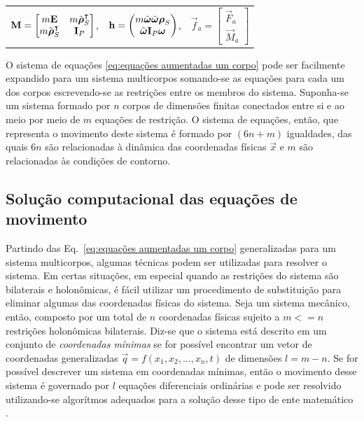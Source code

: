 \begin{tabular}{lll}
 $\boldsymbol{\mathrm{M}} = \begin{bmatrix}m\boldsymbol{\mathrm{E}} & m\tilde{\boldsymbol{\mathrm{\rho}}}_S^\intercal\\ m\tilde{\boldsymbol{\mathrm{\rho}}}_S^\intercal & \boldsymbol{\mathrm{I}}_P \end{bmatrix}$, &
 $\boldsymbol{\mathrm{h}} = \begin{pmatrix} m\tilde{\boldsymbol{\mathrm{\omega}}}\tilde{\boldsymbol{\mathrm{\omega}}}\boldsymbol{\mathrm{\rho}}_S \\ \tilde{\boldsymbol{\mathrm{\omega}}}\boldsymbol{\mathrm{I}}_P\boldsymbol{\mathrm{\omega}} \end{pmatrix}$, &
 $\vec{f}_{a} = \begin{bmatrix} \vec{F}_{a} \\ \vec{M}_{a} \end{bmatrix}$
\end{tabular}

O sistema de equações \eqref{eq:equações aumentadas um corpo} pode ser facilmente expandido para um sistema multicorpos somando-se as equações para cada um dos corpos escrevendo-se as restrições entre os membros do sistema. Suponha-se um sistema formado por $n$ corpos de dimensões finitas conectados entre si e ao meio por meio de $m$ equações de restrição. O sistema de equações, então, que representa o movimento deste sistema é formado por $(6n+m)$ igualdades, das quais $6n$ são relacionadas à dinâmica das coordenadas físicas $\vec{x}$  e $m$ são relacionadas às condições de contorno.


\subsection{Solução computacional das equações de movimento}
Partindo das Eq.~\eqref{eq:equações aumentadas um corpo} generalizadas para um sistema multicorpos, algumas técnicas podem ser utilizadas para resolver o sistema. Em certas situações, em especial quando as restrições do sistema são bilaterais e holonômicas, é fácil utilizar um procedimento de substituição \cite{geradin_flexible_2001,pfeiffer_mechanical_2005,shabana_multi-body_2008} para eliminar algumas das coordenadas físicas do sistema. Seja um sistema mecânico, então, composto por um total de $n$ coordenadas físicas sujeito a $m<=n$ restrições holonômicas bilaterais. Diz-se que o sistema está descrito em um conjunto de \textit{coordenadas mínimas} se for possível encontrar um vetor de coordenadas generalizadas $\vec{q} = f(x_1,x_2,\ldots,x_n,t)$ de dimensões $l = m-n$. Se for possível descrever um sistema em coordenadas mínimas, então o movimento desse sistema é governado por $l$ equações diferenciais ordinárias e pode ser resolvido utilizando-se algorítmos adequados para a solução desse tipo de ente matemático \cite{pfeiffer_mechanical_2005,pfeiffer_multibody_2004,geradin_flexible_2001,woernle_mehrkorpersysteme_2011}.


